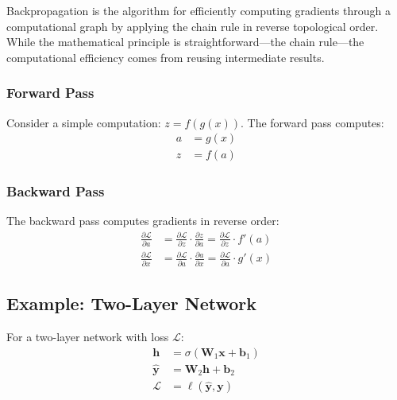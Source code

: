 Backpropagation is the algorithm for efficiently computing gradients through a computational graph by applying the chain rule in reverse topological order. While the mathematical principle is straightforward---the chain rule---the computational efficiency comes from reusing intermediate results.

\subsubsection{Forward Pass}

Consider a simple computation: $z = f(g(x))$. The forward pass computes:
\begin{align}
a &= g(x) \\
z &= f(a)
\end{align}

\subsubsection{Backward Pass}

The backward pass computes gradients in reverse order:
\begin{align}
\frac{\partial \mathcal{L}}{\partial a} &= \frac{\partial \mathcal{L}}{\partial z} \cdot \frac{\partial z}{\partial a} = \frac{\partial \mathcal{L}}{\partial z} \cdot f'(a) \\
\frac{\partial \mathcal{L}}{\partial x} &= \frac{\partial \mathcal{L}}{\partial a} \cdot \frac{\partial a}{\partial x} = \frac{\partial \mathcal{L}}{\partial a} \cdot g'(x)
\end{align}

\subsection{Example: Two-Layer Network}

For a two-layer network with loss $\mathcal{L}$:
\begin{align}
\mathbf{h} &= \sigma(\mathbf{W}_1 \mathbf{x} + \mathbf{b}_1) \\
\hat{\mathbf{y}} &= \mathbf{W}_2 \mathbf{h} + \mathbf{b}_2 \\
\mathcal{L} &= \ell(\hat{\mathbf{y}}, \mathbf{y})
\end{align}

